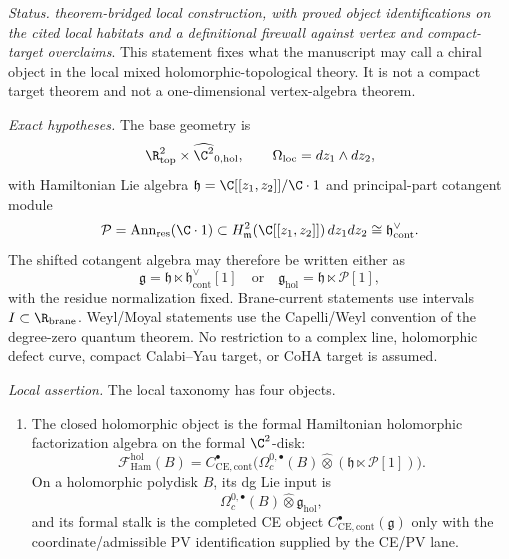 \begin{stmt}\label{thm:lane-local-chiral-taxonomy}
  \emph{Status.} \emph{theorem-bridged local construction, with proved
  object identifications on the cited local habitats and a definitional
  firewall against vertex and compact-target overclaims}.  This statement
  fixes what the manuscript may call a chiral object in the local mixed
  holomorphic-topological theory.  It is not a compact target theorem and
  not a one-dimensional vertex-algebra theorem.

  \emph{Exact hypotheses.} The base geometry is
  \[
    \R^2_{\mathrm{top}}\times
    \widehat{\C^2}_{0,\mathrm{hol}},
    \qquad
    \Omega_{\mathrm{loc}}=dz_1\wedge dz_2,
  \]
  with Hamiltonian Lie algebra
  \(\mathfrak h=\C[[z_1,z_2]]/\C\cdot1\) and principal-part cotangent
  module
  \[
    \mathcal P=\operatorname{Ann}_{\mathrm{res}}(\C\cdot1)
    \subset H^2_{\mathfrak m}(\C[[z_1,z_2]])\,dz_1dz_2
    \cong\mathfrak h^\vee_{\mathrm{cont}} .
  \]
  The shifted cotangent algebra may therefore be written either as
  \[
    \mathfrak g=\mathfrak h\ltimes
    \mathfrak h^\vee_{\mathrm{cont}}[1]
    \quad\text{or}\quad
    \mathfrak g_{\mathrm{hol}}=\mathfrak h\ltimes\mathcal P[1],
  \]
  with the residue normalization fixed.  Brane-current statements use
  intervals \(I\subset\R_{\mathrm{brane}}\).  Weyl/Moyal statements use
  the Capelli/Weyl convention of the degree-zero quantum theorem.  No
  restriction to a complex line, holomorphic defect curve, compact
  Calabi--Yau target, or CoHA target is assumed.

  \emph{Local assertion.} The local taxonomy has four objects.
  \begin{enumerate}[label=(\arabic*)]
    \item The closed holomorphic object is the formal Hamiltonian
      holomorphic factorization algebra on the formal \(\C^2\)-disk:
      \[
        \mathcal F_{\mathrm{Ham}}^{\mathrm{hol}}(B)
        =
        C^\bullet_{\mathrm{CE},\mathrm{cont}}
        \bigl(\Omega^{0,\bullet}_c(B)\widehat\otimes
        (\mathfrak h\ltimes\mathcal P[1])\bigr).
      \]
      On a holomorphic polydisk \(B\), its dg Lie input is
      \[
        \Omega^{0,\bullet}_c(B)\widehat\otimes
        \mathfrak g_{\mathrm{hol}},
      \]
      and its formal stalk is the completed CE object
      \(C^\bullet_{\mathrm{CE},\mathrm{cont}}(\mathfrak g)\) only with the
      coordinate/admissible PV identification supplied by the CE/PV lane.


\end{enumerate}
\end{stmt}
